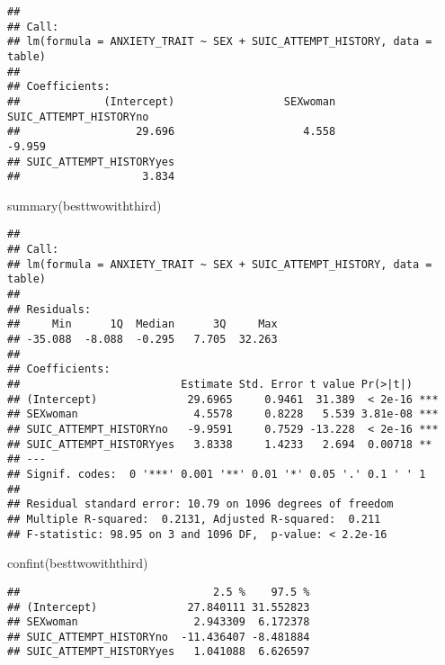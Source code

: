 \documentclass[
]{book}
\newenvironment{Shaded}{\begin{snugshade}}{\end{snugshade}}
\newcommand{\FunctionTok}[1]{\textcolor[rgb]{0.00,0.00,0.00}{#1}}
\newcommand{\NormalTok}[1]{#1}
\begin{document}
\begin{verbatim}
## 
## Call:
## lm(formula = ANXIETY_TRAIT ~ SEX + SUIC_ATTEMPT_HISTORY, data = table)
## 
## Coefficients:
##             (Intercept)                 SEXwoman   SUIC_ATTEMPT_HISTORYno  
##                  29.696                    4.558                   -9.959  
## SUIC_ATTEMPT_HISTORYyes  
##                   3.834
\end{verbatim}

\begin{Shaded}
\begin{Highlighting}[]
\FunctionTok{summary}\NormalTok{(besttwowiththird)}
\end{Highlighting}
\end{Shaded}

\begin{verbatim}
## 
## Call:
## lm(formula = ANXIETY_TRAIT ~ SEX + SUIC_ATTEMPT_HISTORY, data = table)
## 
## Residuals:
##     Min      1Q  Median      3Q     Max 
## -35.088  -8.088  -0.295   7.705  32.263 
## 
## Coefficients:
##                         Estimate Std. Error t value Pr(>|t|)    
## (Intercept)              29.6965     0.9461  31.389  < 2e-16 ***
## SEXwoman                  4.5578     0.8228   5.539 3.81e-08 ***
## SUIC_ATTEMPT_HISTORYno   -9.9591     0.7529 -13.228  < 2e-16 ***
## SUIC_ATTEMPT_HISTORYyes   3.8338     1.4233   2.694  0.00718 ** 
## ---
## Signif. codes:  0 '***' 0.001 '**' 0.01 '*' 0.05 '.' 0.1 ' ' 1
## 
## Residual standard error: 10.79 on 1096 degrees of freedom
## Multiple R-squared:  0.2131, Adjusted R-squared:  0.211 
## F-statistic: 98.95 on 3 and 1096 DF,  p-value: < 2.2e-16
\end{verbatim}

\begin{Shaded}
\begin{Highlighting}[]
\FunctionTok{confint}\NormalTok{(besttwowiththird)}
\end{Highlighting}
\end{Shaded}

\begin{verbatim}
##                              2.5 %    97.5 %
## (Intercept)              27.840111 31.552823
## SEXwoman                  2.943309  6.172378
## SUIC_ATTEMPT_HISTORYno  -11.436407 -8.481884
## SUIC_ATTEMPT_HISTORYyes   1.041088  6.626597
\end{verbatim}
\end{document}
